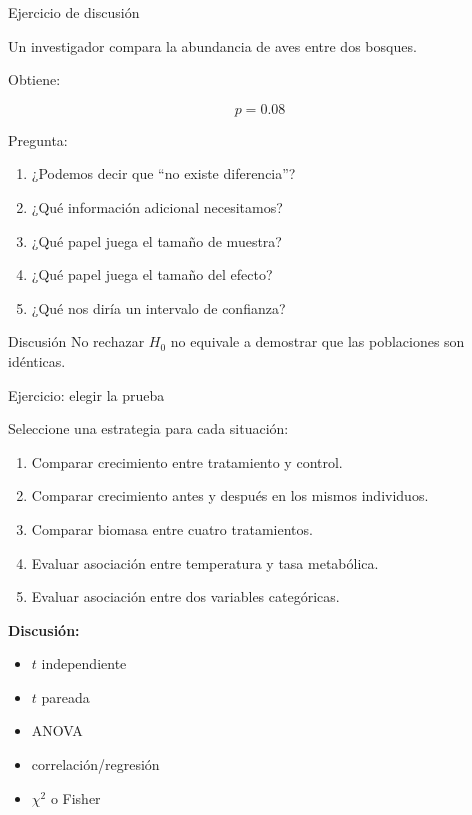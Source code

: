 \begin{frame}{Ejercicio de discusión}

Un investigador compara la abundancia de aves entre dos bosques.

Obtiene:

\[
p=0.08
\]

Pregunta:

\begin{enumerate}
    \item ¿Podemos decir que ``no existe diferencia''?
    \item ¿Qué información adicional necesitamos?
    \item ¿Qué papel juega el tamaño de muestra?
    \item ¿Qué papel juega el tamaño del efecto?
    \item ¿Qué nos diría un intervalo de confianza?
\end{enumerate}

\vspace{0.3cm}

\pause

\begin{block}{Discusión}
No rechazar $H_0$ no equivale a demostrar que las poblaciones son idénticas.
\end{block}

\end{frame}

\begin{frame}{Ejercicio: elegir la prueba}

Seleccione una estrategia para cada situación:

\begin{enumerate}
    \item Comparar crecimiento entre tratamiento y control.
    \item Comparar crecimiento antes y después en los mismos individuos.
    \item Comparar biomasa entre cuatro tratamientos.
    \item Evaluar asociación entre temperatura y tasa metabólica.
    \item Evaluar asociación entre dos variables categóricas.
\end{enumerate}

\vspace{0.3cm}

\pause

\textbf{Discusión:}

\begin{itemize}
    \item $t$ independiente
    \item $t$ pareada
    \item ANOVA
    \item correlación/regresión
    \item $\chi^2$ o Fisher
\end{itemize}

\end{frame}


